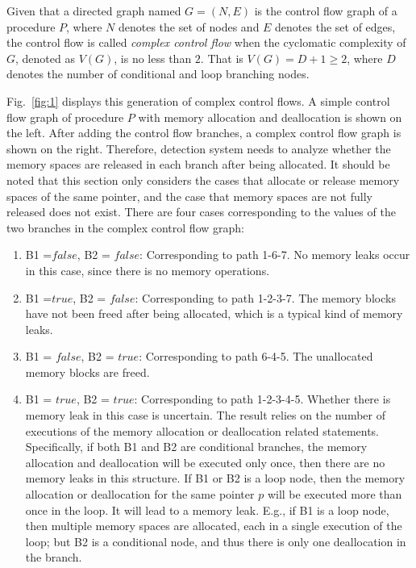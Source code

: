 \begin{definition}
Given that a directed graph named $G= (N, E)$ is the control flow graph of a procedure $P$, where $N$ denotes the set of nodes and $E$ denotes the set of edges, the control flow is called \emph{complex control flow} when the cyclomatic complexity of $G$, denoted as $V(G)$, is no less than $2$. That is $V(G)=D+1\geq 2$, where $D$ denotes the number of conditional and loop branching nodes.
\end{definition} 

Fig.~\ref{fig:1} displays this generation of complex control flows. A simple control flow graph of procedure $P$ with memory allocation and deallocation is shown on the left. After adding the control flow branches, a complex control flow graph is shown on the right. Therefore, detection system needs to analyze whether the memory spaces are released in each branch after being allocated. It should be noted that this section only considers the cases that allocate or release memory spaces of the same pointer, and the case that memory spaces are not fully released does not exist. There are four cases corresponding to the values of the two branches in the complex control flow graph:
\begin{enumerate}
\item
B1 =$\mathit{false}$, B2 = $\mathit{false}$: Corresponding to path 1-6-7. No memory leaks occur in this case, since there is no memory operations.
\item
B1 =$\mathit{true}$, B2 = $\mathit{false}$: Corresponding to path 1-2-3-7. The memory blocks have not been freed after being allocated, which is a typical kind of memory leaks.
\item 
B1 = $\mathit{false}$, B2 = $\mathit{true}$: Corresponding to path 6-4-5. The unallocated memory blocks are freed.
\item
B1 = $\mathit{true}$, B2 = $\mathit{true}$: Corresponding to path 1-2-3-4-5. Whether there is memory leak in this case is uncertain. The result relies on the number of executions of the memory allocation or deallocation related statements. Specifically, if both B1 and B2 are conditional branches, the memory allocation and deallocation will be executed only once, then there are no memory leaks in this structure. If B1 or B2 is a loop node, then the memory allocation or deallocation for the same pointer $p$ will be executed more than once in the loop. It will lead to a memory leak. E.g., if B1 is a loop node, then multiple memory spaces are allocated, each in a single execution of the loop; but B2 is a conditional node, and thus there is only one deallocation in the branch. %
\end{enumerate}

